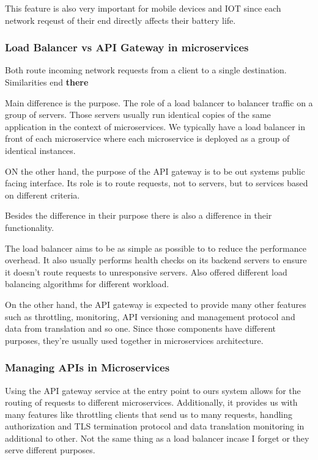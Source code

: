 \begin{note}
    This feature is also very important for mobile devices and IOT since each network reqeust of their end directly affects their battery life.
\end{note}

\subsubsection{Load Balancer vs API Gateway in microservices}

Both route incoming network requests from a client to a single destination.
Similarities end \textbf{there}

Main difference is the purpose.
The role of a load balancer to balancer traffic on a group of servers.
Those servers usually run identical copies of the same application in the context of microservices.
We typically have a load balancer in front of each microservice where each microservice is deployed as a group of identical instances.

ON the other hand, the purpose of the API gateway is to be out systems public facing interface.
Its role is to route requests, not to servers, but to services based on different criteria.

Besides the difference in their purpose there is also a difference in their functionality.

The load balancer aims to be as simple as possible to to reduce the performance overhead.
It also usually performs health checks on its backend servers to ensure it doesn't route requests to unresponsive servers.
Also offered different load balancing algorithms for different workload.

On the other hand, the API gateway is expected to provide many other features such as throttling, monitoring, API versioning and management protocol and data from translation and so one.
Since those components have different purposes, they're usually used together in microservices architecture.

\subsubsection{Managing APIs in Microservices}
Using the API gateway service at the entry point to ours system allows for the routing of requests to different microservices.
Additionally, it provides us with many features like throttling clients that send us to many requests, handling authorization and TLS termination protocol and data translation monitoring in additional to other.
Not the same thing as a load balancer incase I forget or they serve different purposes.
